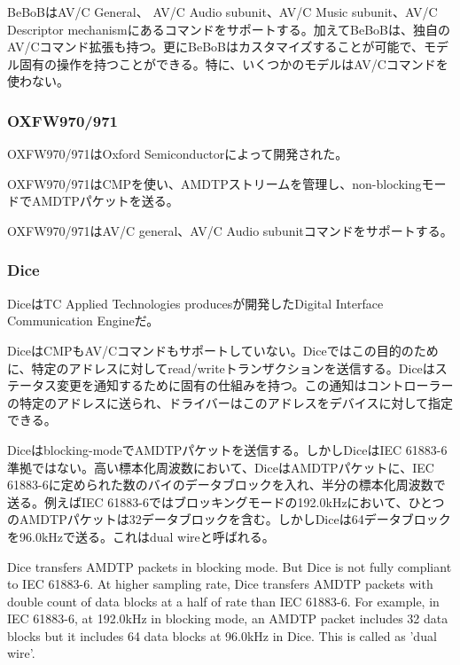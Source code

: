 \documentclass[onecolumn]{jarticle}
\begin{document}
BeBoBはAV/C General\cite{avc-general-4-2}、 AV/C Audio subunit\cite{avc-audio-1}、AV/C Music subunit\cite{avc-music-1}、AV/C Descriptor mechanism\cite{avc-general-enhancement}にあるコマンドをサポートする。加えてBeBoBは、独自のAV/Cコマンド拡張\cite{bebob-1, bebob-2}も持つ。更にBeBoBはカスタマイズすることが可能で、モデル固有の操作を持つことができる。特に、いくつかのモデルはAV/Cコマンドを使わない。

\subsubsection{OXFW970/971}

OXFW970/971はOxford Semiconductorによって開発された。

OXFW970/971はCMPを使い、AMDTPストリームを管理し、non-blockingモードでAMDTPパケットを送る。

OXFW970/971はAV/C general\cite{avc-general-4-2}、AV/C Audio subunit\cite{avc-audio-1}コマンドをサポートする。


\subsubsection{Dice}

DiceはTC Applied Technologies producesが開発したDigital Interface Communication Engineだ。

DiceはCMPもAV/Cコマンドもサポートしていない。Diceではこの目的のために、特定のアドレスに対してread/writeトランザクションを送信する。Diceはステータス変更を通知するために固有の仕組みを持つ。この通知はコントローラーの特定のアドレスに送られ、ドライバーはこのアドレスをデバイスに対して指定できる。

Diceはblocking-modeでAMDTPパケットを送信する。しかしDiceはIEC 61883-6準拠ではない。高い標本化周波数において、DiceはAMDTPパケットに、IEC 61883-6に定められた数のバイのデータブロックを入れ、半分の標本化周波数で送る。例えばIEC 61883-6ではブロッキングモードの192.0kHzにおいて、ひとつのAMDTPパケットは32データブロックを含む。しかしDiceは64データブロックを96.0kHzで送る。これはdual wireと呼ばれる。

Dice transfers AMDTP packets in blocking mode. But Dice is not fully compliant to IEC 61883-6. At higher sampling rate, Dice transfers AMDTP packets with double count of data blocks at a half of rate than IEC 61883-6. For example, in IEC 61883-6, at 192.0kHz in blocking mode, an AMDTP packet includes 32 data blocks but it includes 64 data blocks at 96.0kHz in Dice. This is called as 'dual wire'.
\end{document}
